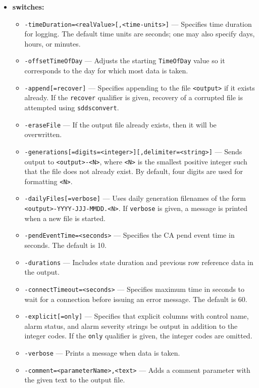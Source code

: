 \begin{itemize}
%
\item {\bf switches:}
%
%
    \begin{itemize}
      \item {\tt -timeDuration=<realValue>[,<time-units>]} --- Specifies time duration for logging.
        The default time units are seconds; one may also specify days, hours, or minutes.
      \item {\tt -offsetTimeOfDay} --- Adjusts the starting \verb+TimeOfDay+ value so it corresponds to the day for which most data is taken.
      \item {\tt -append[=recover]} --- Specifies appending to the file \verb+<output>+ if it exists already.
        If the \verb+recover+ qualifier is given, recovery of a corrupted file is attempted using \verb+sddsconvert+.
      \item {\tt -eraseFile} --- If the output file already exists, then it will be overwritten.
      \item {\verb+-generations[=digits=<integer>][,delimiter=<string>]+} ---
        Sends output to \verb+<output>-<N>+, where \verb+<N>+ is the smallest positive integer such that the file does not already exist.
        By default, four digits are used for formatting \verb+<N>+.
      \item {\tt -dailyFiles[=verbose]} --- Uses daily generation filenames of the form \verb+<output>-YYYY-JJJ-MMDD.<N>+.
        If \verb+verbose+ is given, a message is printed when a new file is started.
      \item {\tt -pendEventTime=<seconds>} --- Specifies the CA pend event time in seconds. The default is 10.
      \item {\tt -durations} --- Includes state duration and previous row reference data in the output.
      \item {\tt -connectTimeout=<seconds>} --- Specifies maximum time in seconds to wait for a connection before issuing an error message.
        The default is 60.
      \item {\tt -explicit[=only]} --- Specifies that explicit columns with control name, alarm status, and alarm severity strings be output in addition to the integer codes.
        If the \verb+only+ qualifier is given, the integer codes are omitted.
      \item {\tt -verbose} --- Prints a message when data is taken.
      \item {\tt -comment=<parameterName>,<text>} --- Adds a comment parameter with the given text to the output file.

\end{itemize}
\end{itemize}

